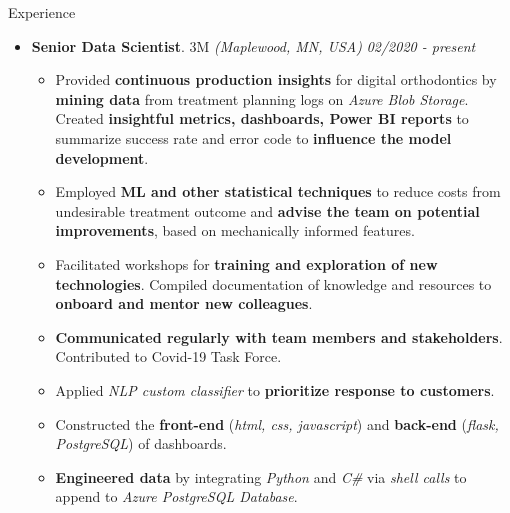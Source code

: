 \documentclass{resume} %
\begin{document}
	
	\begin{rSection}{Experience}
		
		\begin{itemize}[leftmargin=0em]
			
			\item {\bf Senior Data Scientist}{. 3M \textit{(Maplewood, MN, USA)}} \hfill {\em 02/2020 - present}\\
			\vspace{-5mm}
			\begin{itemize}
				\setlength\itemsep{-1.75em}			
				\item Provided \textbf{continuous production insights} for digital orthodontics  by \textbf{mining data} from treatment planning logs on \textit{Azure Blob Storage}. Created \textbf{insightful metrics, dashboards, Power BI reports} to summarize success rate and error code to \textbf{influence the model development}.\\
				\item Employed \textbf{ML and other statistical techniques} to reduce costs from undesirable treatment outcome and \textbf{advise the team on potential improvements}, based on mechanically informed features.\\
				\item Facilitated workshops for \textbf{training and exploration of new technologies}. Compiled documentation of knowledge and resources to \textbf{onboard and mentor new colleagues}.\\
				\item \textbf{Communicated regularly with team members and stakeholders}. Contributed to Covid-19 Task Force.\\
				\item Applied \textit{NLP custom classifier} to \textbf{prioritize response to customers}. \\
				\item Constructed the \textbf{front-end} (\textit{html, css, javascript}) and \textbf{back-end} (\textit{flask, PostgreSQL}) of dashboards.\\
				\item \textbf{Engineered data} by integrating \textit{Python} and \textit{C\#} via \textit{shell calls} to append to \textit{Azure PostgreSQL Database}.
				
			\end{itemize}	
		

\end{itemize}
\end{rSection}
\end{document}
